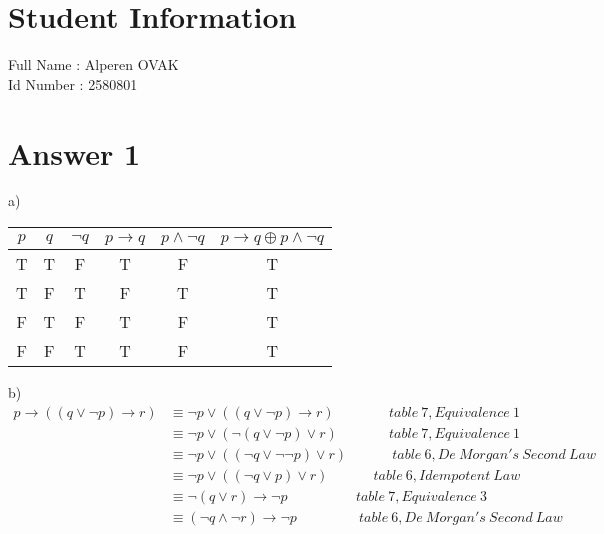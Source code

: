 \documentclass[12pt]{article}
\begin{document}
\section*{Student Information } 
Full Name :  Alperen OVAK\\
Id Number :  2580801\\

\section*{Answer 1}

\hspace{5mm} a)\\
\begin{table}[H]
\small
\centering
\begin{tabular}{|c|c|c|c|c|c|}
\hline
$p$ & $q$ & $\neg q$ & $p\rightarrow q$ & $ p\wedge \neg q$ & $ p\rightarrow q \oplus p\wedge \neg q $\\
\hline
T & T & F & T & F & T \\
T & F & T & F & T & T \\
F & T & F & T & F & T \\
F & F & T & T & F & T \\
\hline
\end{tabular}
\end{table}

b)\\
\begin{equation*}
\begin{split}
 p \rightarrow ((q \vee \neg p) \rightarrow r) &
 \equiv \neg p \vee ((q \vee \neg p) \rightarrow r)\ \ \ \qquad \quad \ table\ 7, Equivalence \ 1\\
 &
 \equiv \neg p \vee (\neg(q \vee \neg p) \vee r)\ \ \ \quad \quad \quad table\ 7, Equivalence\ 1\\
 &
 \equiv \neg p \vee ((\neg q \vee \neg \neg p) \vee r) \quad \quad \quad \ table\ 6, De\ Morgan's\ Second\ Law\\ &
 \equiv \neg p \vee ((\neg q \vee  p) \vee r) \quad \quad \quad \ table\ 6, Idempotent\ Law\\ &
 \equiv \neg(q \vee r) \rightarrow \neg p \ \ \ \quad \qquad \quad \ table\ 7, Equivalence\ 3\\ &
 \equiv (\neg q \wedge \neg r) \rightarrow \neg p \ \qquad \qquad \ table\ 6, De\ Morgan's\ Second\ Law\\
\end{split}
\end{equation*}
\end{document}
